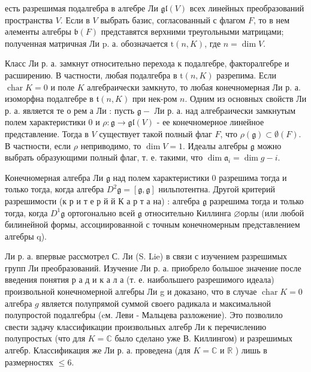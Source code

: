 \documentclass[10pt]{article}
\begin{document}
есть разрешимая подалгебра в алгебре Ли $\mathfrak{g l}(V)$ всех линейных преобразований пространства $V$. Если в $V$ выбрать базис, согласованный с флагом $F$, то в нем әлементы алгебры $\mathfrak{b}(F)$ представятся верхними треугольными матрицами; полученная матричная Ли p. а. обозначается $\mathrm{t}(n, K)$, где $n=\operatorname{dim} V$.



Класс Ли р. а. замкнут относительно перехода к подалгебре, факторалгебре и расширению. В частности, любая подалгебра в $\mathrm{t}(n, K)$ разрепима. Если $\operatorname{char} K=0$ и поле $K$ алгебраически замкнуто, то любая конечномерная Ли р. а. изоморфна подалгебре в $\mathfrak{t}(n, K)$ при нек-ром $n$. Одним из основных свойств Ли р. а. является те о рем а Ли : пусть $\mathfrak{g}-$ Ли р. а. над алгебраически замкнутым полем характеристики 0 и $\rho: \mathfrak{g} \rightarrow \mathfrak{g l}(V)$ - ее конечномерное линейное представление. Тогда в $V$ существует такой полный флаг $F$, что $\rho(\mathfrak{g}) \subset \emptyset(F)$. В частности, если $\rho$ неприводимо, то $\operatorname{dim} V=1$. Идеалы алгебры $\mathfrak{g}$ можно выбрать образующими полный флаг, т. е. такими, что $\operatorname{dim} \mathfrak{a}_{i}=\operatorname{dim} g-i$.



Конечномерная алгебра Ли $\mathfrak{g}$ над полем характеристики 0 разрешима тогда и только тогда, когда алгебра $D^{2} \mathfrak{g}=[\mathfrak{g}, \mathfrak{g}]$ нильпотентна. Другой критерий разрешимости (к р и т е р й й К а р т а на) : алгебра $\mathfrak{g}$ разрешима тогда и только тогда, когда $D^{1} \mathfrak{g}$ ортогонально всей $\mathfrak{g}$ относительно Киллинга $\varnothing о р л ы$ (или любой билинейной формы, ассоциированной с точным конечномерным представлением алгебры q).



Ли р. а. впервые рассмотрел С. Ли (S. Lie) в связи с изучением разрешимых групп Ли преобразований. Изучение Ли р. а. приобрело большое значение после введения понятия р а д и к а л а (т. е. наибольшего разрешимого идеала) произвольной конечномерной алгебры Ли g и доказано, что в случае $\operatorname{char} K=0$ алгебра $g$ является полупрямой суммой своего радикала и максимальной полупростой подалгебры (cм. Леви - Мальцева разложение). Это позволило свести задачу классификации произвольных алгебр Ли к перечислению полупростых (что для $K=\mathbb{C}$ было сделано уже В. Киллингом) и разрешимых алгебр. Классификация же Ли р. а. проведена (для $K=\mathbb{C}$ и $\mathbb{R}$ ) лишь в размерностях $\leqslant 6$.
\end{document}
